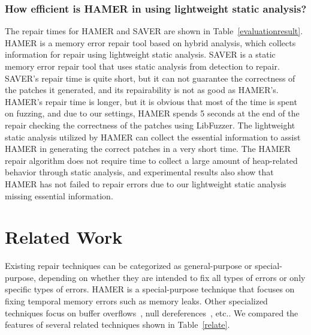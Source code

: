 \documentclass[a4paper,11pt,oneside,openany]{book}
\begin{document}
\vspace{0.4cm}
\hspace{-0.7cm}


\subsection[Research Question 3]{How efficient is HAMER in using lightweight static analysis?}
The repair times for HAMER and SAVER are shown in Table~\ref{evaluationresult}. HAMER is a memory error repair tool based on hybrid analysis, which collects information for repair using lightweight static analysis. SAVER is a static memory error repair tool that uses static analysis from detection to repair. SAVER's repair time is quite short, but it can not guarantee the correctness of the patches it generated, and its repairability is not as good as HAMER's. HAMER's repair time is longer, but it is obvious that most of the time is spent on fuzzing, and due to our settings, HAMER spends 5 seconds at the end of the repair checking the correctness of the patches using LibFuzzer. The lightweight static analysis utilized by HAMER can collect the essential information to assist HAMER in generating the correct patches in a very short time. The HAMER repair algorithm does not require time to collect a large amount of heap-related behavior through static analysis, and experimental results also show that HAMER has not failed to repair errors due to our lightweight static analysis missing essential information.

\vspace{0.4cm}
\hspace{-0.7cm}

\chapter{Related Work}
Existing repair techniques can be categorized as general-purpose or special-purpose, depending on whether they are intended to fix all types of errors or only specific types of errors. HAMER is a special-purpose technique that focuses on fixing temporal memory errors such as memory leaks. Other specialized techniques focus on buffer overflows~\cite{buffer}, null dereferences~\cite{Getafix,npe}, etc.. We compared the features of several related techniques shown in Table~\ref{relate}.
\end{document}
